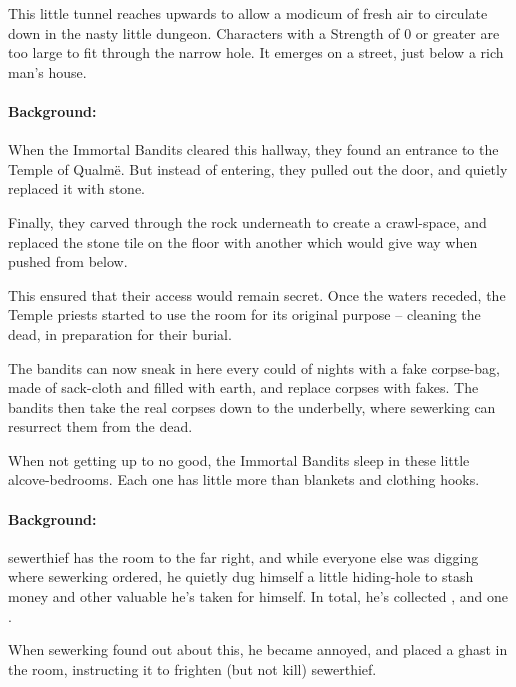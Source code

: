 \begin{multicols}{2}
\begin{boxtext}
\end{boxtext}


This little tunnel reaches upwards to allow a modicum of fresh air to circulate down in the nasty little dungeon.  Characters with a Strength of 0 or greater are too large to fit through the narrow hole.  It emerges on a street, just below a rich man's house.


\paragraph{Background:}
When the Immortal Bandits cleared this hallway, they found an entrance to the Temple of Qualm\"e.
But instead of entering, they pulled out the door, and quietly replaced it with stone.

Finally, they carved through the rock underneath to create a crawl-space, and replaced the stone tile on the floor with another which would give way when pushed from below.

This ensured that their access would remain secret.
Once the waters receded, the Temple priests started to use the room for its original purpose -- cleaning the dead, in preparation for their burial.

The bandits can now sneak in here every could of nights with a fake corpse-bag, made of sack-cloth and filled with earth, and replace corpses with fakes.
The bandits then take the real corpses down to the underbelly, where \gls{sewerking} can resurrect them from the dead.


When not getting up to no good, the Immortal Bandits sleep in these little alcove-bedrooms.
Each one has little more than blankets and clothing hooks.

\paragraph{Background:}
\Gls{sewerthief} has the room to the far right, and while everyone else was digging where \gls{sewerking} ordered, he quietly dug himself a little hiding-hole to stash money and other valuable he's taken for himself.
In total, he's collected \lootMedium, and one \lootMagic.

When \gls{sewerking} found out about this, he became annoyed, and placed a ghast in the room, instructing it to frighten (but not kill) \gls{sewerthief}.


\end{multicols}

